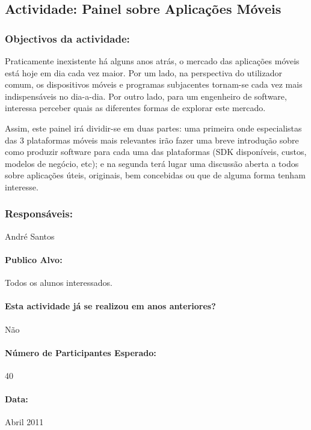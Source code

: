 \subsection{Actividade: Painel sobre Aplicações Móveis} %

\subsubsection*{Objectivos da actividade:}
Praticamente inexistente há alguns anos atrás, o mercado das aplicações móveis está hoje em dia cada vez maior. Por um lado, na perspectiva do utilizador comum, os dispositivos móveis e programas subjacentes tornam-se cada vez mais indispensáveis no dia-a-dia. Por outro lado, para um engenheiro de software, interessa perceber quais as diferentes formas de explorar este mercado.

Assim, este painel irá dividir-se em duas partes: uma primeira onde especialistas das 3 plataformas móveis mais relevantes irão fazer uma breve introdução sobre como produzir software para cada uma das plataformas (SDK disponíveis, custos, modelos de negócio, etc); e na segunda terá lugar uma discussão aberta a todos sobre aplicações úteis, originais, bem concebidas ou que de alguma forma tenham interesse.
\subsubsection*{Responsáveis:}
\begin{itemizedash}
	\item{André Santos}
\end{itemizedash}

\paragraph{Publico Alvo: }
Todos os alunos interessados.

\paragraph{Esta actividade já se realizou em anos anteriores?}
Não

\paragraph{Número de Participantes Esperado:}
40

\paragraph{Data:} Abril 2011

